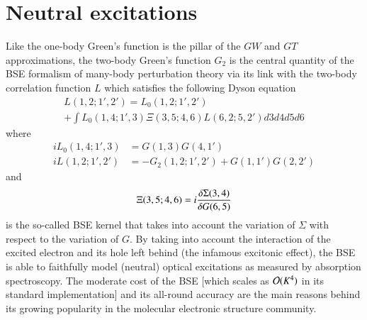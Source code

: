 \documentclass[aip,jcp,reprint,noshowkeys,superscriptaddress]{revtex4-1}
\begin{document}
\section{Neutral excitations}
\label{sec:neutral}
Like the one-body Green's function is the pillar of the $GW$ and $GT$ approximations, the two-body Green's function $G_2$ is the central quantity of the BSE formalism of many-body perturbation theory \cite{Salpeter_1951,Strinati_1988,Blase_2018,Blase_2020} via its link with the two-body correlation function $L$ which satisfies the following Dyson equation 
\begin{multline}
	 L(1,2;1',2') = L_0(1,2;1',2') 
	 \\
	 + \int L_0(1,4;1',3) \Xi(3,5;4,6) L(6,2;5,2') d3d4d5d6
\end{multline}
where
\begin{subequations}
\begin{align}
\label{eq:L0}
	 iL_0(1,4;1',3) & = G(1,3) G(4,1')
	 \\
\label{eq:L}
	 iL(1,2;1',2') & = -G_2(1,2;1',2') + G(1,1')G(2,2')
\end{align}
\end{subequations}
and 
\begin{equation}
\label{eq:Xi}
	\Xi(3,5;4,6) = i \fdv{\Sigma(3,4)}{G(6,5)}
\end{equation}
is the so-called BSE kernel that takes into account the variation of $\Sigma$ with respect to the variation of $G$.
By taking into account the interaction of the excited electron and its hole left behind (the infamous excitonic effect), the BSE is able to faithfully model (neutral) optical excitations as measured by absorption spectroscopy. 
The moderate cost of the BSE [which scales as $\order*{K^4}$ in its standard implementation] and its all-round accuracy are the main reasons behind its growing popularity in the molecular electronic structure community. \cite{Rohlfing_1999a,Horst_1999,Puschnig_2002,Tiago_2003,Rocca_2010,Boulanger_2014,Jacquemin_2015a,Bruneval_2015,Jacquemin_2015b,Hirose_2015,Jacquemin_2017a,Jacquemin_2017b,Rangel_2017,Krause_2017,Gui_2018,Blase_2018,Liu_2020,Blase_2020,Holzer_2018a,Holzer_2018b,Loos_2020e,Loos_2021}
\end{document}
